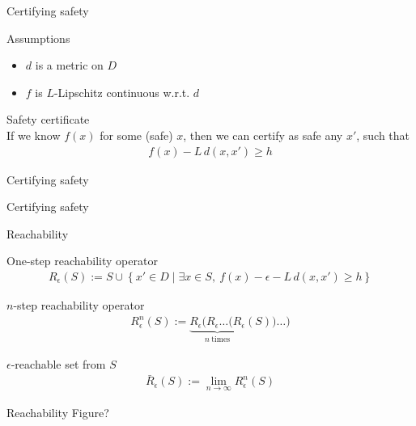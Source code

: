 \documentclass[10pt,mathserif]{beamer}
\newlength\figureheight
\newlength\figurewidth
\newcommand{\Reps}{R_{\epsilon}}
\newcommand{\Rbeps}{\bar{R}_{\epsilon}}
\begin{document}
\begin{frame}{Certifying safety}

{\large Assumptions}
\begin{itemize}
\item $d$ is a metric on $D$
\item $f$ is $L$-Lipschitz continuous w.r.t. $d$
\end{itemize}
\vspace{2em}
{\large Safety certificate}\\[0.5em]
If we know $f(x)$ for some (safe) $x$, then we can certify as safe any $x'$, such that
\begin{align*}
f(x) - L\,d(x, x') \geq h
\end{align*}
\end{frame}

\begin{frame}{Certifying safety}
\centering
\setlength\figurewidth{4.2in}
\setlength\figureheight{2.36in}

\end{frame}

\begin{frame}{Certifying safety}
\centering
\setlength\figurewidth{4.2in}
\setlength\figureheight{2.36in}

\end{frame}

\begin{frame}{Reachability}

{\large One-step reachability operator}
\begin{align*}
\Reps(S) := S \cup \left\{x' \in D \mid \exists x \in S,\ f(x) - \epsilon - L\,d(x, x') \geq h\right\}
\end{align*}
\vspace{1em}

{\large $n$-step reachability operator}
\begin{align*}
\Reps^n(S) := \underbrace{\Reps(\Reps\ldots(\Reps}_{n\ \mathrm{times}}(S))\ldots)
\end{align*}
\vspace{1em}

{\large $\epsilon$-reachable set from $S$}
\begin{align*}
\Rbeps(S) := \displaystyle\lim_{n \to \infty} \Reps^n(S)
\end{align*}
\end{frame}

\begin{frame}{Reachability}
Figure?
\end{frame}
\end{document}
